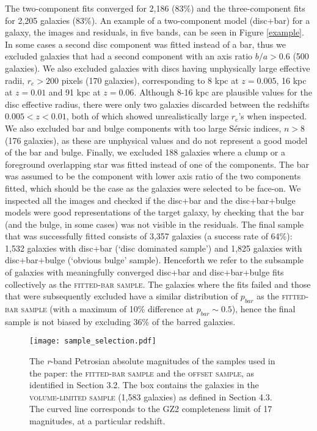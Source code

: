 \documentclass[a4paper,fleqn,usenatbib,useAMS]{mnras}
\begin{document}
The two-component fits converged for 2,186 (83\%) and the three-component fits for 2,205 galaxies (83\%). An example of a two-component model (disc+bar) for a galaxy, the images and residuals, in five bands, can be seen in Figure \ref{example}. In some cases a second disc component was fitted instead of a bar, thus we excluded galaxies that had a second component with an axis ratio $b/a>0.6$ (500 galaxies). We also excluded galaxies with discs having unphysically large effective radii, $r_{e}>200$ pixels (170 galaxies), corresponding to 8 kpc at $z=0.005$, 16 kpc at $z=0.01$ and 91 kpc at $z=0.06$. Although 8-16 kpc are plausible values for the disc effective radius, there were only two galaxies discarded between the redshifts $0.005<z<0.01$, both of which showed unrealistically large $r_{e}$'s when inspected. We also excluded bar and bulge components with too large S\'ersic indices, $n>8$ (176 galaxies), as these are unphysical values and do not represent a good model of the bar and bulge. Finally, we excluded 188 galaxies where a clump or a foreground overlapping star was fitted instead of one of the components. The bar was assumed to be the component with lower axis ratio of the two components fitted, which should be the case as the galaxies were selected to be face-on. We inspected all the images and checked if the disc+bar and the disc+bar+bulge models were good representations of the target galaxy, by checking that the bar (and the bulge, in some cases) was not visible in the residuals. The final sample that was successfully fitted consists of 3,357 galaxies (a success rate of 64\%): 1,532 galaxies with disc+bar (`disc dominated sample') and 1,825 galaxies with disc+bar+bulge (`obvious bulge' sample). Henceforth we refer to the subsample of galaxies with meaningfully converged disc+bar and disc+bar+bulge fits collectively as the \textsc{fitted-bar sample}. The galaxies where the fits failed and those that were subsequently excluded have a similar distribution of $p_{bar}$ as the \textsc{fitted-bar sample} (with a maximum of 10\% difference at $p_{bar}\sim0.5$), hence the final sample is not biased by excluding 36\% of the barred galaxies.

\begin{figure}
 \texttt{[image: sample\_selection.pdf]}
 \caption{The \textit{r}-band Petrosian absolute magnitudes of the samples used in the paper: the \textsc{fitted-bar sample} and the \textsc{offset sample}, as identified in Section 3.2. The box contains the galaxies in the \textsc{volume-limited sample} (1,583 galaxies) as defined in Section 4.3. The curved line corresponds to the GZ2 completeness limit of 17 magnitudes, at a particular redshift.}
 \label{sample_selection}
\end{figure}
\end{document}
